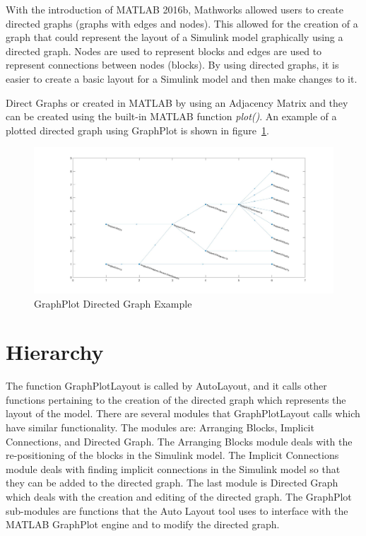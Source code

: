 \documentclass[12pt,letterpaper]{report}
\newcommand{\tool}{Auto Layout\xspace}
\begin{document}
\par With the introduction of MATLAB 2016b, Mathworks allowed users to create directed graphs (graphs with edges and nodes). This allowed for the creation of a graph that could represent the layout of a Simulink model graphically using a directed graph. Nodes are used to represent blocks and edges are used to represent connections between nodes (blocks). By using directed graphs, it is easier to create a basic layout for a Simulink model and then make changes to it.
\par Direct Graphs or created in MATLAB by using an Adjacency Matrix and they can be created using the built-in MATLAB function \textit{plot()}. An example of a plotted directed graph using GraphPlot is shown in figure~\ref{fig:GraphPlotExample}.
\begin{figure}[H]
	\centering
	\includegraphics[width=1\linewidth]{images/graph_plot}
	\caption{GraphPlot Directed Graph Example}
	\label{fig:GraphPlotExample}
\end{figure}

\section{Hierarchy}
\par The function GraphPlotLayout is called by AutoLayout, and it calls other functions pertaining to the creation of the directed graph which represents the layout of the model. There are several modules that GraphPlotLayout calls which have similar functionality. The modules are: Arranging  Blocks, Implicit Connections, and Directed Graph. The Arranging Blocks module deals with the re-positioning of the blocks in the Simulink model. The Implicit Connections module deals with finding implicit connections in the Simulink model so that they can be added to the directed graph. The last module is Directed Graph which deals with the creation and editing of the directed graph. The GraphPlot sub-modules are functions that the \tool tool uses to interface with the MATLAB GraphPlot engine and to modify the directed graph.
\end{document}

